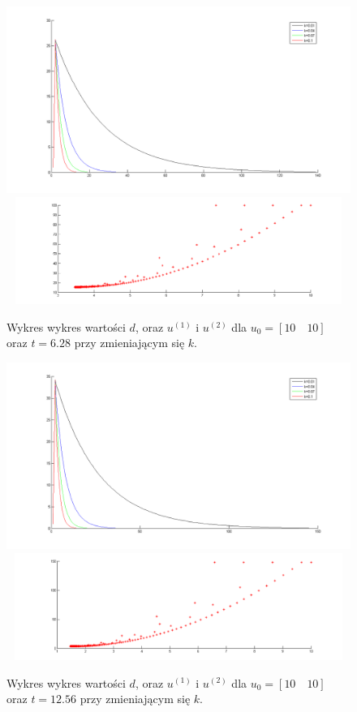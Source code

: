 \documentclass[a4paper,10pt]{article}
\begin{document}
\begin{figure}[!h]
    \centering
	\includegraphics[width=120mm]{CW4-alg2fun2-u10_10-k001_01-t628-d.png}
	\includegraphics[width=120mm,height=35mm]{CW4-alg2fun2-u10_10-k001_01-t628-u.png}
	\caption{Wykres wykres wartości $d$, oraz $u^{(1)}$ i $u^{(2)}$ dla $u_0=[10 \quad 10]$ oraz $t=6.28$ przy zmieniającym się $k$.}
    \label{fig:Rysunek}
\end{figure}
\begin{figure}[!h]
    \centering
	\includegraphics[width=120mm]{CW4-alg2fun2-u10_10-k001_01-t1256-d.png}
	\includegraphics[width=120mm,height=35mm]{CW4-alg2fun2-u10_10-k001_01-t1256-u.png}
	\caption{Wykres wykres wartości $d$, oraz $u^{(1)}$ i $u^{(2)}$ dla $u_0=[10 \quad 10]$ oraz $t=12.56$ przy zmieniającym się $k$.}
    \label{fig:Rysunek}
\end{figure}
\end{document}
